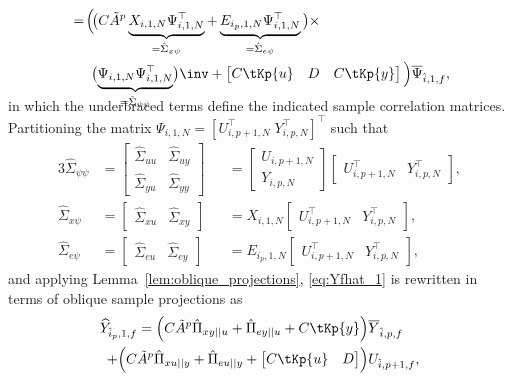 \begin{align}
    \begin{split}
        &=\!\Big(\!\big(C \tilde{A}^p \underbrace{X_{i,1,N}\Psi_{i,1,N}^\top}_{=\hat{\Sigma}_{x\psi}} + \underbrace{E_{i_p,1,N}\Psi_{i,1,N}^\top}_{=\hat{\Sigma}_{e\psi}}\big)\times\\
        &\phantom{==}\big(\smash{\underbrace{\Psi_{i,1,N}\Psi_{i,1,N}^\top}_{=\hat{\Sigma}_{\psi\psi}}}\big)\inv+\begin{bmatrix}C\tKp{u} & D & C\tKp{y}\end{bmatrix}\Big)\overline{\Psi}_{\hat{i},1,f},
    \end{split}
\end{align}
in which the underbraced terms define the indicated sample correlation matrices. Partitioning the matrix $\Psi_{i,1,N}=[U_{i,p+1,N}^\top\;Y_{i,p,N}^\top]^\top$ such that
\begin{alignat*}{3}
    \hat{\Sigma}_{\psi\psi}&=\begin{bmatrix}
        \hat{\Sigma}_{uu} & \hat{\Sigma}_{uy}\\
        \hat{\Sigma}_{yu} & \hat{\Sigma}_{yy}
    \end{bmatrix} &&= \begin{bmatrix} U_{i,p+1,N} \\ Y_{i,p,N} \end{bmatrix}\begin{bmatrix} U_{i,p+1,N}^\top & Y_{i,p,N}^\top \end{bmatrix},\\
    \hat{\Sigma}_{x\psi}&=\begin{bmatrix}
        \hat{\Sigma}_{xu} & \hat{\Sigma}_{xy}
    \end{bmatrix} &&= X_{i,1,N}\begin{bmatrix} U_{i,p+1,N}^\top & Y_{i,p,N}^\top \end{bmatrix},\\
    \hat{\Sigma}_{e\psi}&=\begin{bmatrix}
        \hat{\Sigma}_{eu} & \hat{\Sigma}_{ey}
    \end{bmatrix} &&= E_{i_p,1,N}\begin{bmatrix} U_{i,p+1,N}^\top & Y_{i,p,N}^\top \end{bmatrix},
\end{alignat*}
and applying Lemma~\ref{lem:oblique_projections}, \eqref{eq:Yfhat_1} is rewritten in terms of oblique sample projections as
\begin{align}%
    \begin{split}
    \widehat{Y}_{\hat{i}_p,1,f} = \Big(C\tilde{A}^p\hat{\Pi}_{xy||u}+\hat{\Pi}_{ey||u}
    + C\tKp{y}\Big)&\overline{Y}_{\hat{i},p,f}\\
    +\Big(C\tilde{A}^p\hat{\Pi}_{xu||y}+\hat{\Pi}_{eu||y}+
    \begin{bmatrix}C\tKp{u} & D \end{bmatrix}\!\Big)&U_{\hat{i},p+1,f},
    \end{split}
\end{align}
